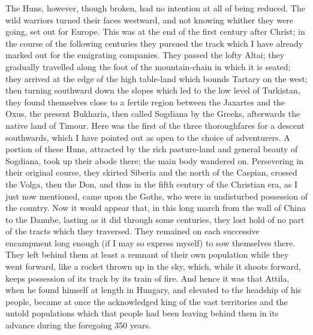 The Huns, however, though
broken, had no intention at all of being reduced. The wild warriors
turned their faces westward, and not knowing whither they were going,
set out for Europe. This was at the end of the first century after
Christ; in the course of the following centuries they pursued the
track which I have already marked out for the emigrating companies.
They passed the lofty Altai; they gradually travelled along the foot
of the mountain-chain in which it is seated; they arrived at the edge
of the high table-land which bounds Tartary on the west; then turning
southward down the slopes which led to the low level of Turkistan,
they found themselves close to a fertile region between the Jaxartes
and the Oxus, the present Bukharia, then called Sogdiana by the
Greeks, afterwards the native land of Timour. Here was the first of
the three thoroughfares for a descent southwards, which I have pointed
out as open to the choice of adventurers. A portion of these Huns,
attracted by the rich pasture-land and general beauty of Sogdiana,
took up their abode there; the main body wandered on. Persevering in
their original course, they skirted Siberia and the north of the
Caspian, crossed the Volga, then the Don, and thus in the fifth
century of the Christian era, as I just now mentioned, came upon the Goths, who were in undisturbed possession of the country. Now it
would appear that, in this long march from the wall of China to the
Danube, lasting as it did through some centuries, they lost hold of no
part of the tracts which they traversed. They remained on each
successive encampment long enough (if I may so express myself) to sow
themselves there. They left behind them at least a remnant of their
own population while they went forward, like a rocket thrown up in the
sky, which, while it shoots forward, keeps possession of its track by
its train of fire. And hence it was that Attila, when he found himself
at length in Hungary, and elevated to the headship of his people,
became at once the acknowledged king of the vast territories and the
untold populations which that people had been leaving behind them in
its advance during the foregoing 350 years.

